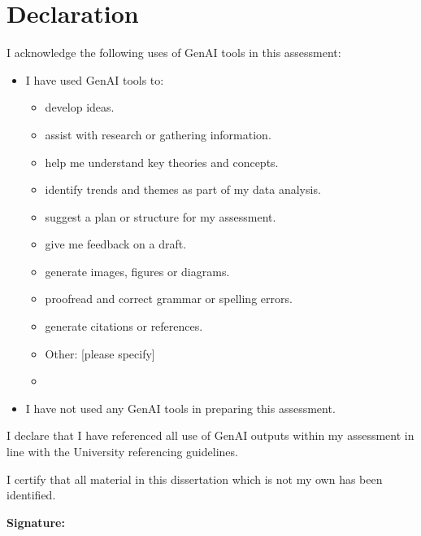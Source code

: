 \documentclass[11pt,a4paper]{article}
\begin{document}
%
\newpage
\thispagestyle{empty}
\section*{Declaration}
I acknowledge the following uses of GenAI tools in this assessment:


\begin{itemize}[label={\ $\square$\ }, leftmargin=*]


  \item I have used GenAI tools to:
  \begin{itemize}[label={\ $\square$\ }, leftmargin=*]
    \item develop ideas.
    \item assist with research or gathering information.
    \item help me understand key theories and concepts.
    \item identify trends and themes as part of my data analysis.
    \item suggest a plan or structure for my assessment.
    \item give me feedback on a draft.
    \item generate images, figures or diagrams.
    \item proofread and correct grammar or spelling errors.
    \item generate citations or references.
    \item Other: [please specify]
    \item[]
  \end{itemize}

  \item I have not used any GenAI tools in preparing this assessment.
\end{itemize}

\bigskip
I declare that I have referenced all use of GenAI outputs within my assessment in line with the University referencing guidelines.

\vspace{1em}
I certify that all material in this dissertation which is not my own has been identified.

\vspace{5em}
{\bf\noindent Signature:} \hrulefill
\newpage


\tableofcontents
\thispagestyle{empty}
\newpage
\end{document}
